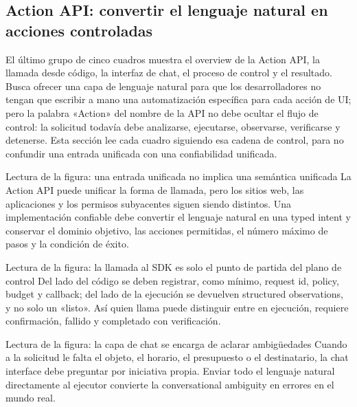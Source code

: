 \subsection{Action API: convertir el lenguaje natural en acciones controladas}

El último grupo de cinco cuadros muestra el overview de la Action API, la llamada desde código, la interfaz de chat, el proceso de control y el resultado. Busca ofrecer una capa de lenguaje natural para que los desarrolladores no tengan que escribir a mano una automatización específica para cada acción de UI; pero la palabra «Action» del nombre de la API no debe ocultar el flujo de control: la solicitud todavía debe analizarse, ejecutarse, observarse, verificarse y detenerse. Esta sección lee cada cuadro siguiendo esa cadena de control, para no confundir una entrada unificada con una confiabilidad unificada.


\begin{knowledgebox}{Lectura de la figura: una entrada unificada no implica una semántica unificada}
La Action API puede unificar la forma de llamada, pero los sitios web, las aplicaciones y los permisos subyacentes siguen siendo distintos. Una implementación confiable debe convertir el lenguaje natural en una typed intent y conservar el dominio objetivo, las acciones permitidas, el número máximo de pasos y la condición de éxito.
\end{knowledgebox}


\begin{knowledgebox}{Lectura de la figura: la llamada al SDK es solo el punto de partida del plano de control}
Del lado del código se deben registrar, como mínimo, request id, policy, budget y callback; del lado de la ejecución se devuelven structured observations, y no solo un «listo». Así quien llama puede distinguir entre en ejecución, requiere confirmación, fallido y completado con verificación.
\end{knowledgebox}


\begin{knowledgebox}{Lectura de la figura: la capa de chat se encarga de aclarar ambigüedades}
Cuando a la solicitud le falta el objeto, el horario, el presupuesto o el destinatario, la chat interface debe preguntar por iniciativa propia. Enviar todo el lenguaje natural directamente al ejecutor convierte la conversational ambiguity en errores en el mundo real.
\end{knowledgebox}

